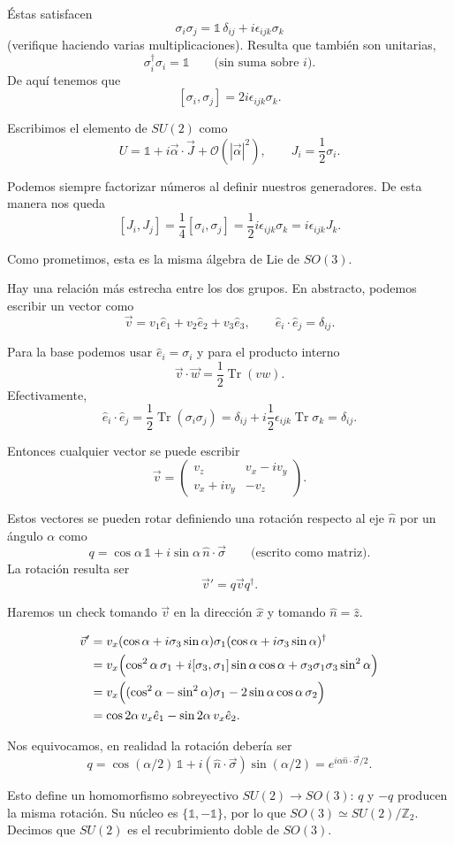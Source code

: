 \documentclass[11pt,a4paper]{article}
\newcommand{\Tr}{\operatorname{Tr}}
\begin{document}
Éstas satisfacen
\[
  \sigma_i\sigma_j
  =\mathbb 1\,\delta_{ij}+i\epsilon_{ijk}\sigma_k
\]
(verifique haciendo varias multiplicaciones). Resulta que también son unitarias,
\[
  \sigma_i^\dagger\sigma_i=\mathbb 1\qquad\text{(sin suma sobre }i\text{)}.
\]
De aquí tenemos que
\[
  [\sigma_i,\sigma_j]=2i\epsilon_{ijk}\sigma_k.
\]

Escribimos el elemento de $SU(2)$ como
\[
  U=\mathbb 1+i\vec\alpha\cdot\vec J+\mathcal O(|\vec\alpha|^2),
  \qquad
  J_i=\frac12\sigma_i.
\]

Podemos siempre factorizar números al definir nuestros generadores. De esta manera nos queda
\[
  [J_i,J_j]
  =\frac14[\sigma_i,\sigma_j]
  =\frac12i\epsilon_{ijk}\sigma_k
  =i\epsilon_{ijk}J_k.
\]

Como prometimos, esta es la misma álgebra de Lie de $SO(3)$.

Hay una relación más estrecha entre los dos grupos. En abstracto, podemos escribir un vector como
\[
  \vec v=v_1\hat e_1+v_2\hat e_2+v_3\hat e_3,
  \qquad
  \hat e_i\cdot\hat e_j=\delta_{ij}.
\]

Para la base podemos usar $\hat e_i=\sigma_i$ y para el producto interno
\[
  \vec v\cdot\vec w=\frac12\Tr(vw).
\]
Efectivamente,
\[
  \hat e_i\cdot\hat e_j
  =\frac12\Tr(\sigma_i\sigma_j)
  =\delta_{ij}+i\frac12\epsilon_{ijk}\Tr\sigma_k
  =\delta_{ij}.
\]

Entonces cualquier vector se puede escribir
\[
  \vec v=
  \begin{pmatrix}
    v_z&v_x-iv_y\\
    v_x+iv_y&-v_z
  \end{pmatrix}.
\]

Estos vectores se pueden rotar definiendo una rotación respecto al eje $\hat n$ por un ángulo $\alpha$ como
\[
  q=\cos\alpha\,\mathbb1+i\sin\alpha\,\hat n\cdot\vec\sigma
  \qquad\text{(escrito como matriz)}.
\]
La rotación resulta ser
\[
  \vec v'=q\vec vq^\dagger.
\]

Haremos un check tomando $\vec v$ en la dirección $\hat x$ y tomando $\hat n=\hat z$.

\begin{align*}
  \vec v'
  &=v_x(\cos\alpha+i\sigma_3\sin\alpha)
    \sigma_1(\cos\alpha+i\sigma_3\sin\alpha)^\dagger\\
  &=v_x\Bigl(
      \cos^2\alpha\,\sigma_1
      +i[\sigma_3,\sigma_1]\sin\alpha\cos\alpha
      +\sigma_3\sigma_1\sigma_3\sin^2\alpha
    \Bigr)\\
  &=v_x\Bigl(
      (\cos^2\alpha-\sin^2\alpha)\sigma_1
      -2\sin\alpha\cos\alpha\,\sigma_2
    \Bigr)\\
  &=\cos2\alpha\,v_x\hat e_1
    -\sin2\alpha\,v_x\hat e_2.
\end{align*}

Nos equivocamos, en realidad la rotación debería ser
\[
  q=\cos(\alpha/2)\,\mathbb1+i(\hat n\cdot\vec\sigma)\sin(\alpha/2)
   =e^{i\alpha\hat n\cdot\vec\sigma/2}.
\]

Esto define un homomorfismo sobreyectivo $SU(2)\to SO(3)$:
$q$ y $-q$ producen la misma rotación. Su núcleo es
$\{\mathbb1,-\mathbb1\}$, por lo que $SO(3)\simeq SU(2)/\mathbb Z_2$.
Decimos que $SU(2)$ es el recubrimiento doble de $SO(3)$.
\end{document}
